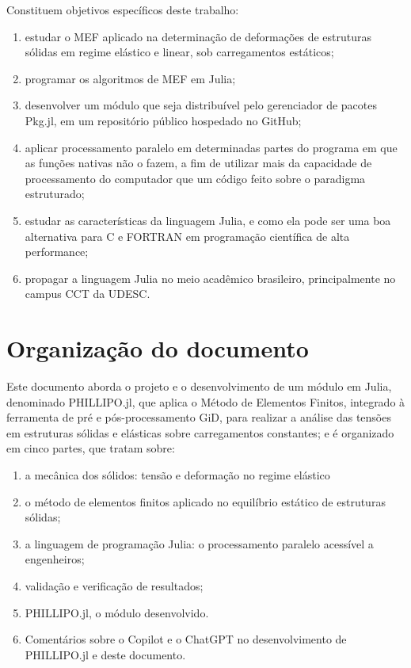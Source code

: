 Constituem objetivos específicos deste trabalho:

\begin{enumerate}
    \item estudar o MEF aplicado na determinação de deformações de estruturas sólidas em regime elástico e linear, sob carregamentos estáticos;
    \item programar os algoritmos de MEF em Julia;
    \item desenvolver um módulo que seja distribuível pelo gerenciador de pacotes Pkg.jl, em um repositório público hospedado no GitHub;
    \item aplicar processamento paralelo em determinadas partes do programa em que as funções nativas não o fazem, a fim de utilizar mais da capacidade de processamento do computador que um código feito sobre o paradigma estruturado;
    \item estudar as características da linguagem Julia, e como ela pode ser uma boa alternativa para C e FORTRAN em programação científica de alta performance;
    \item propagar a linguagem Julia no meio acadêmico brasileiro, principalmente no campus CCT da UDESC.
\end{enumerate}

\section{Organização do documento}

Este documento aborda o projeto e o desenvolvimento de um módulo em Julia, denominado PHILLIPO.jl, que aplica o Método de Elementos Finitos, integrado à ferramenta de pré e pós-processamento GiD, para realizar a análise das tensões em estruturas sólidas e elásticas sobre carregamentos constantes; e é organizado em cinco partes, que tratam sobre:

\begin{enumerate}
    \item a mecânica dos sólidos: tensão e deformação no regime elástico
    \item o método de elementos finitos aplicado no equilíbrio estático de estruturas sólidas;
    \item a linguagem de programação Julia: o processamento paralelo acessível a engenheiros;
    \item validação e verificação de resultados;
    \item PHILLIPO.jl, o módulo desenvolvido.
    \item Comentários sobre o Copilot e o ChatGPT no desenvolvimento de PHILLIPO.jl e deste documento.
\end{enumerate}
